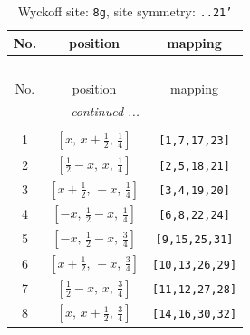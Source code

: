 \documentclass[fleqn,8pt]{jsarticle}
\begin{document}
\renewcommand{\arraystretch}{1.2}
\begin{longtable}{ccc}
\caption{Wyckoff site: {\tt 8g}, site symmetry: {\tt ..21'}}
 \\
 \hline \hline
No. & position & mapping \\ \hline \endfirsthead

\multicolumn{2}{l}{\tablename\ \thetable{}} \\
 \hline \hline
No. & position & mapping \\ \hline \endhead

 \hline \hline
\multicolumn{2}{r}{\footnotesize\it continued ...} \\ \endfoot

 \hline \hline
\multicolumn{2}{r}{} \\ \endlastfoot

1 & $\left[ x,\, x + \frac{1}{2},\, \frac{1}{4} \right]$ & {\tt [1,7,17,23]} \\ \hline
2 & $\left[ \frac{1}{2} - x,\, x,\, \frac{1}{4} \right]$ & {\tt [2,5,18,21]} \\ \hline
3 & $\left[ x + \frac{1}{2},\, - x,\, \frac{1}{4} \right]$ & {\tt [3,4,19,20]} \\ \hline
4 & $\left[ - x,\, \frac{1}{2} - x,\, \frac{1}{4} \right]$ & {\tt [6,8,22,24]} \\ \hline
5 & $\left[ - x,\, \frac{1}{2} - x,\, \frac{3}{4} \right]$ & {\tt [9,15,25,31]} \\ \hline
6 & $\left[ x + \frac{1}{2},\, - x,\, \frac{3}{4} \right]$ & {\tt [10,13,26,29]} \\ \hline
7 & $\left[ \frac{1}{2} - x,\, x,\, \frac{3}{4} \right]$ & {\tt [11,12,27,28]} \\ \hline
8 & $\left[ x,\, x + \frac{1}{2},\, \frac{3}{4} \right]$ & {\tt [14,16,30,32]} \\
\end{longtable}
\renewcommand{\arraystretch}{1.2}
\end{document}
